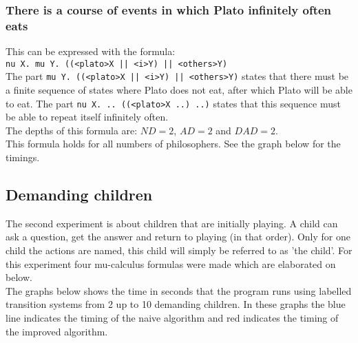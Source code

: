 \documentclass[10pt,a4paper]{article}
\begin{document}

\subsubsection{There is a course of events in which Plato infinitely often eats}
This can be expressed with the formula:\\
{\tt nu X. mu Y. ((<plato>X || <i>Y) || <others>Y)}\\
The part {\tt mu Y. ((<plato>X || <i>Y) || <others>Y)} states that there must be a finite sequence of states where Plato does not eat, after which Plato will be able to eat. The part {\tt nu X. .. ((<plato>X ..) ..)} states that this sequence must be able to repeat itself infinitely often.\\
The depths of this formula are: $ND = 2$, $AD = 2$ and $DAD = 2$.\\
This formula holds for all numbers of philosophers. See the graph below for the timings.\\


\subsection{Demanding children}
The second experiment is about children that are initially playing. A child can ask a question, get the answer and return to playing (in that order). Only for one child the actions are named, this child will simply be referred to as 'the child'. For this experiment four mu-calculus formulas were made which are elaborated on below.\\
The graphs below shows the time in seconds that the program runs using labelled transition systems from 2 up to 10 demanding children. In these graphs the blue line indicates the timing of the naive algorithm and red indicates the timing of the improved algorithm.
\end{document}
